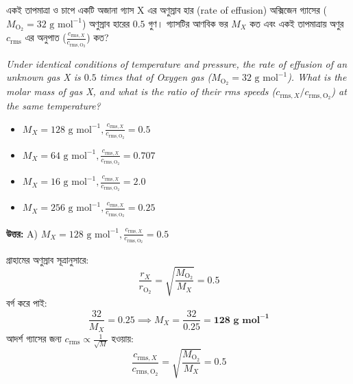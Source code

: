 \documentclass[12pt, a4paper]{article}
\begin{document}
\begin{tcolorbox}[questionbox={প্রশ্ন (Question) 22}]
    \noindent
    একই তাপমাত্রা ও চাপে একটি অজানা গ্যাস X এর অণুস্রাব হার (rate of effusion) অক্সিজেন গ্যাসের ($M_{\text{O}_2} = 32\text{ g mol}^{-1}$) অণুস্রাব হারের $0.5$ গুণ। গ্যাসটির আণবিক ভর $M_X$ কত এবং একই তাপমাত্রায় অণুর $c_{\text{rms}}$ এর অনুপাত ($\frac{c_{\text{rms},X}}{c_{\text{rms},\text{O}_2}}$) কত?
    
    \vspace{0.8em}
    \begin{english}
    \noindent\textit{\color{darkgray}
    Under identical conditions of temperature and pressure, the rate of effusion of an unknown gas X is $0.5$ times that of Oxygen gas ($M_{\text{O}_2} = 32\text{ g mol}^{-1}$). What is the molar mass of gas X, and what is the ratio of their rms speeds ($c_{\text{rms},X} / c_{\text{rms},\text{O}_2}$) at the same temperature?
    }
    \end{english}
\end{tcolorbox}

\begin{itemize}[label={}, leftmargin=1cm, itemsep=0.5em]
    \item[\textbf{A)}] $M_X = 128\text{ g mol}^{-1}, \frac{c_{\text{rms},X}}{c_{\text{rms},\text{O}_2}} = 0.5$
    \item[\textbf{B)}] $M_X = 64\text{ g mol}^{-1}, \frac{c_{\text{rms},X}}{c_{\text{rms},\text{O}_2}} = 0.707$
    \item[\textbf{C)}] $M_X = 16\text{ g mol}^{-1}, \frac{c_{\text{rms},X}}{c_{\text{rms},\text{O}_2}} = 2.0$
    \item[\textbf{D)}] $M_X = 256\text{ g mol}^{-1}, \frac{c_{\text{rms},X}}{c_{\text{rms},\text{O}_2}} = 0.25$
\end{itemize}

\vspace{0.5em}
\begin{tcolorbox}[answerbox]
    \textbf{\color{success} উত্তর:} A) $M_X = 128\text{ g mol}^{-1}, \frac{c_{\text{rms},X}}{c_{\text{rms},\text{O}_2}} = 0.5$
\end{tcolorbox}
\vspace{1em}

\begin{tcolorbox}[solutionbox={সমাধান (Solution)}]
    \noindent
    গ্রাহামের অণুস্রাব সূত্রানুসারে:
    \[ \frac{r_X}{r_{\text{O}_2}} = \sqrt{\frac{M_{\text{O}_2}}{M_X}} = 0.5 \]
    বর্গ করে পাই:
    \[ \frac{32}{M_X} = 0.25 \implies M_X = \frac{32}{0.25} = \mathbf{128\text{ g mol}^{-1}} \]
    আদর্শ গ্যাসের জন্য $c_{\text{rms}} \propto \frac{1}{\sqrt{M}}$ হওয়ায়:
    \[ \frac{c_{\text{rms}, X}}{c_{\text{rms}, \text{O}_2}} = \sqrt{\frac{M_{\text{O}_2}}{M_X}} = \mathbf{0.5} \]
\end{tcolorbox}
\end{document}
